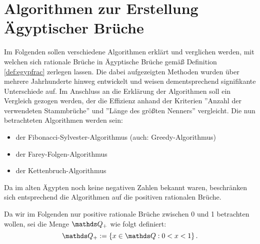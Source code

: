 \section{Algorithmen zur Erstellung Ägyptischer Brüche}\label{sec:algorithmen}
Im Folgenden sollen verschiedene Algorithmen erklärt und verglichen werden, mit welchen sich rationale Brüche in Ägyptische Brüche gemäß Definition \ref{def:egypfrac} zerlegen lassen. Die dabei aufgezeigten Methoden wurden über mehrere Jahrhunderte hinweg entwickelt und weisen dementsprechend signifikante Unterschiede auf. Im Anschluss an die Erklärung der Algorithmen soll ein Vergleich gezogen werden, der die Effizienz anhand der Kriterien ''Anzahl der verwendeten Stammbrüche'' und ''Länge des größten Nenners'' vergleicht.
Die nun betrachteten Algorithmen werden sein:
\begin{itemize}
	\item der Fibonacci-Sylvester-Algorithmus (auch: Greedy-Algorithmus)
	\item der Farey-Folgen-Algorithmus
	\item der Kettenbruch-Algorithmus
\end{itemize}

Da im alten Ägypten noch keine negativen Zahlen bekannt waren, beschränken sich entsprechend die Algorithmen auf die positiven rationalen Brüche.
\begin{def1}
	Da wir im Folgenden nur positive rationale Brüche zwischen 0 und 1 betrachten wollen, sei die Menge $\Q_+$ wie folgt definiert:
	$$\Q_+ := \left\{x \in \Q: 0<x<1\right\}.$$
\end{def1}